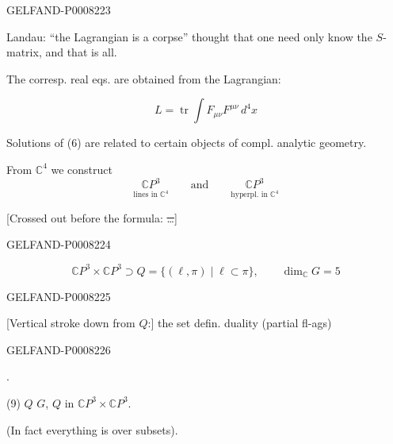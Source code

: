 \begin{GelfandAdjacentEvidence}{GELFAND-P000822}{3}


 \quad Landau: “the Lagrangian is a corpse” thought that one need only know the \(S\)-matrix, and that is all.

The corresp. real eqs. are obtained from the Lagrangian:

\begin{equation*}
L=\operatorname{tr}\int F_{\mu\nu}F^{\mu\nu}\,d^4x
\tag{7}
\end{equation*}

Solutions of (6) are related to certain objects of compl. analytic geometry.

From \(\mathbb{C}^4\) we construct
\[
\underset{\text{lines in \(\mathbb{C}^4\)}}{\mathbb{C}P^3}
\qquad\text{and}\qquad
\underset{\text{hyperpl. in \(\mathbb{C}^4\)}}{\mathbb{C}P^3}
\]

[Crossed out before the formula: \sout{…}]
\end{GelfandAdjacentEvidence}
\begin{GelfandAdjacentEvidence}{GELFAND-P000822}{4}


\begin{equation*}
\mathbb{C}P^3\times\mathbb{C}P^3\supset
 Q=\{(\ell,\pi)\mid\ell\subset\pi\},\qquad \dim_{\mathbb{C}}G=5
\tag{8}
\end{equation*}
\end{GelfandAdjacentEvidence}
\begin{GelfandAdjacentEvidence}{GELFAND-P000822}{5}


[Vertical stroke down from \(Q\):] the set defin. duality (partial fl-ags)
\end{GelfandAdjacentEvidence}
\begin{GelfandAdjacentEvidence}{GELFAND-P000822}{6}


.

(9)  \(Q\)  \(G\), 
 \(Q\) in \(\mathbb{C}P^3\times\mathbb{C}P^3\).

(In fact everything is over subsets).
\end{GelfandAdjacentEvidence}


